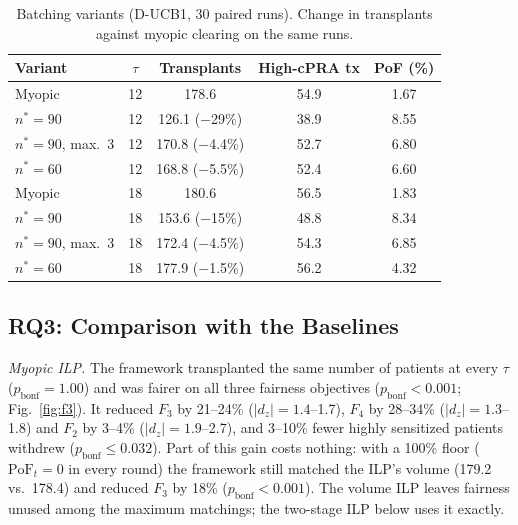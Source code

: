 \documentclass[journal]{IEEEtran}
\newcommand{\pof}{\ensuremath{\mathrm{PoF}_t}}
\begin{document}
\begin{table}[!t]
\centering
\caption{Batching variants (D-UCB1, 30 paired runs). Change in
transplants against myopic clearing on the same runs.}
\label{tab:batch}
\footnotesize
\setlength{\tabcolsep}{3pt}
\begin{tabular}{@{}lcccc@{}}
\toprule
Variant & $\tau$ & Transplants & High-cPRA tx & PoF (\%) \\
\midrule
Myopic                  & 12 & 178.6           & 54.9 & 1.67 \\
$n^* = 90$              & 12 & 126.1 ($-$29\%) & 38.9 & 8.55 \\
$n^* = 90$, max.\ 3     & 12 & 170.8 ($-$4.4\%) & 52.7 & 6.80 \\
$n^* = 60$              & 12 & 168.8 ($-$5.5\%) & 52.4 & 6.60 \\
\midrule
Myopic                  & 18 & 180.6           & 56.5 & 1.83 \\
$n^* = 90$              & 18 & 153.6 ($-$15\%) & 48.8 & 8.34 \\
$n^* = 90$, max.\ 3     & 18 & 172.4 ($-$4.5\%) & 54.3 & 6.85 \\
$n^* = 60$              & 18 & 177.9 ($-$1.5\%) & 56.2 & 4.32 \\
\bottomrule
\end{tabular}
\end{table}

\subsection{RQ3: Comparison with the Baselines}
\label{sec:results:rq3}

\emph{Myopic ILP.} The framework transplanted the same number of
patients at every $\tau$ ($p_{\mathrm{bonf}} = 1.00$) and was fairer
on all three fairness objectives ($p_{\mathrm{bonf}} < 0.001$;
Fig.~\ref{fig:f3}). It reduced $F_3$ by 21--24\%
($|d_z| = 1.4$--1.7), $F_4$ by 28--34\% ($|d_z| = 1.3$--1.8) and
$F_2$ by 3--4\% ($|d_z| = 1.9$--2.7), and 3--10\% fewer highly
sensitized patients withdrew ($p_{\mathrm{bonf}} \leq 0.032$). Part of
this gain costs nothing: with a 100\% floor ($\pof = 0$ in every
round) the framework still matched the ILP's volume (179.2 vs.\
178.4) and reduced $F_3$ by 18\% ($p_{\mathrm{bonf}} < 0.001$). The
volume ILP leaves fairness unused among the maximum matchings; the
two-stage ILP below uses it exactly.
\end{document}
